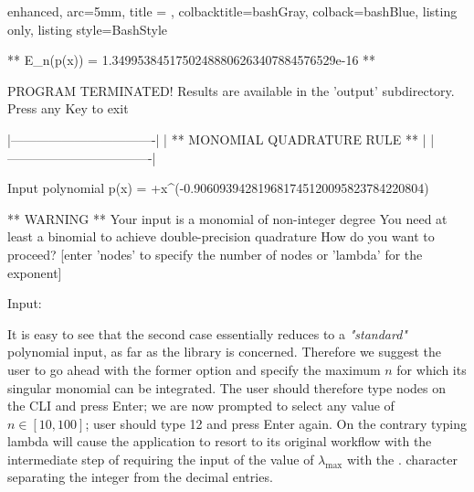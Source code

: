 \documentclass[a4paper, twosided]{book}
\begin{document}
\begin{tcblisting}{enhanced,
                   arc=5mm,
                   title = \color{black}{\large \ttfamily Building and executing the test driver: p\_2(x)},
                   colbacktitle=bashGray,
                   colback=bashBlue,
                   listing only,
                   listing style=BashStyle}

** E_n(p(x)) = 1.34995384517502488806263407884576529e-16 **


PROGRAM TERMINATED! Results are available in the 'output' subdirectory.
Press any Key to exit 


    |----------------------------------|
    |  ** MONOMIAL QUADRATURE RULE **  |
    |----------------------------------|


 Input polynomial p(x) = +x^(-0.906093942819681745120095823784220804) 

   ** WARNING ** Your input is a monomial of non-integer degree
                 You need at least a binomial to achieve double-precision quadrature
                 How do you want to proceed?
   [enter 'nodes' to specify the number of nodes or 'lambda' for the exponent]

                 Input: 

\end{tcblisting}

It is easy to see that the second case essentially reduces to a \textsl{"standard"} polynomial input, as far as the library is concerned. Therefore we suggest the user to go ahead with the former option and specify the maximum $n$ for which its singular monomial can be integrated. The user should therefore type \colorbox{poliGrayBlue}{nodes} on the CLI and press Enter; we are now prompted to select any value of $n\in[10,100]$; user should type 12 and press Enter again. On the contrary typing \colorbox{poliGrayBlue}{lambda} will cause the application to resort to its original workflow with the intermediate step of requiring the input of the value of $\lambda_{\text{max}}$ with the \colorbox{poliGrayBlue}{.} character separating the integer from the decimal entries.
\end{document}
